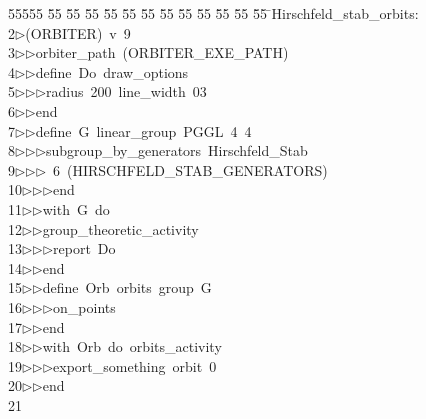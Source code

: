 %
%
\begin{tabbing}
55555 \= 55 \= 55 \= 55 \= 55 \= 55 \= 55 \= 55 \= 55 \= 55 \= 55 \= 55 \= 55 \= \>Hirschfeld\_stab\_orbits:\\[0pt]
2\>$\triangleright$\>(ORBITER)\ v\ 9\ \\[0pt]
3\>$\triangleright$\>$\triangleright$\>orbiter\_path\ (ORBITER\_EXE\_PATH)\ \\[0pt]
4\>$\triangleright$\>$\triangleright$\>define\ Do\ draw\_options\ \\[0pt]
5\>$\triangleright$\>$\triangleright$\>$\triangleright$\>radius\ 200\ line\_width\ 03\ \\[0pt]
6\>$\triangleright$\>$\triangleright$\>end\ \\[0pt]
7\>$\triangleright$\>$\triangleright$\>define\ G\ linear\_group\ PGGL\ 4\ 4\ \\[0pt]
8\>$\triangleright$\>$\triangleright$\>$\triangleright$\>subgroup\_by\_generators\ Hirschfeld\_Stab\ \\[0pt]
9\>$\triangleright$\>$\triangleright$\>$\triangleright$\ 6\ (HIRSCHFELD\_STAB\_GENERATORS)\ \\[0pt]
10\>$\triangleright$\>$\triangleright$\>$\triangleright$\>end\ \\[0pt]
11\>$\triangleright$\>$\triangleright$\>with\ G\ do\ \\[0pt]
12\>$\triangleright$\>$\triangleright$\>group\_theoretic\_activity\ \\[0pt]
13\>$\triangleright$\>$\triangleright$\>$\triangleright$\>report\ Do\ \\[0pt]
14\>$\triangleright$\>$\triangleright$\>end\ \\[0pt]
15\>$\triangleright$\>$\triangleright$\>define\ Orb\ orbits\ group\ G\ \\[0pt]
16\>$\triangleright$\>$\triangleright$\>$\triangleright$\>on\_points\ \\[0pt]
17\>$\triangleright$\>$\triangleright$\>end\ \\[0pt]
18\>$\triangleright$\>$\triangleright$\>with\ Orb\ do\ orbits\_activity\ \\[0pt]
19\>$\triangleright$\>$\triangleright$\>$\triangleright$\>export\_something\ orbit\ 0\ \\[0pt]
20\>$\triangleright$\>$\triangleright$\>end\\[0pt]
21\>\end{tabbing}
